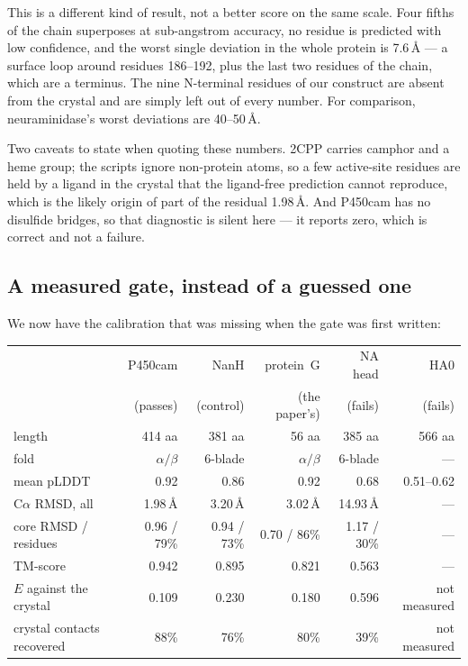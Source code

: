 \documentclass[11pt,a4paper]{article}
\begin{document}
This is a different kind of result, not a better score on the same scale. Four
fifths of the chain superposes at sub-angstrom accuracy, no residue is predicted
with low confidence, and the worst single deviation in the whole protein is
7.6\,\AA{} --- a surface loop around residues 186--192, plus the last two
residues of the chain, which are a terminus. The nine N-terminal residues of our
construct are absent from the crystal and are simply left out of every number.
For comparison, neuraminidase's worst deviations are 40--50\,\AA.

Two caveats to state when quoting these numbers. 2CPP carries camphor and a heme
group; the scripts ignore non-protein atoms, so a few active-site residues are
held by a ligand in the crystal that the ligand-free prediction cannot reproduce,
which is the likely origin of part of the residual 1.98\,\AA. And P450cam has no
disulfide bridges, so that diagnostic is silent here --- it reports zero, which is
correct and not a failure.

\subsection{A measured gate, instead of a guessed one}\label{sec:gate-number}

We now have the calibration that was missing when the gate was first written:

\begin{center}
\begin{tabular}{lrrrrr}
\toprule
 & P450cam & NanH & protein~G & NA head & HA0 \\
 & (passes) & (control) & (the paper's) & (fails) & (fails) \\
\midrule
length                       & 414 aa & 381 aa & 56 aa & 385 aa & 566 aa \\
fold                         & $\alpha/\beta$ & 6-blade & $\alpha/\beta$ & 6-blade & --- \\
mean pLDDT                   & 0.92 & 0.86 & 0.92 & 0.68 & 0.51--0.62 \\
C$\alpha$ RMSD, all          & 1.98\,\AA & 3.20\,\AA & 3.02\,\AA & 14.93\,\AA & --- \\
core RMSD / residues         & 0.96 / 79\% & 0.94 / 73\% & 0.70 / 86\% & 1.17 / 30\% & --- \\
TM-score                     & 0.942 & 0.895 & 0.821 & 0.563 & --- \\
$E$ against the crystal      & 0.109 & 0.230 & 0.180 & 0.596 & not measured \\
crystal contacts recovered   & 88\%  & 76\%  & 80\%  & 39\%  & not measured \\
\bottomrule
\end{tabular}
\end{center}
\end{document}
